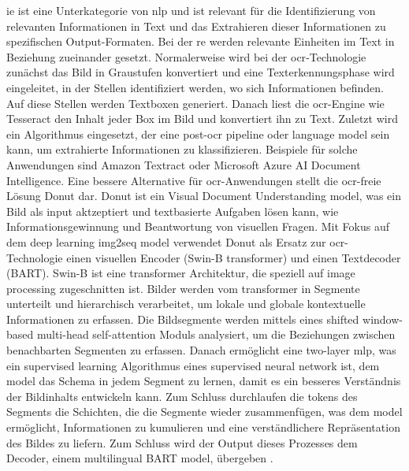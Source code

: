 \gls{ie} ist eine Unterkategorie von \gls{nlp} und ist relevant für die Identifizierung von relevanten Informationen in Text und das Extrahieren dieser Informationen zu spezifischen Output-Formaten. Bei der \gls{re} werden relevante Einheiten im Text in Beziehung zueinander gesetzt. Normalerweise wird bei der \gls{ocr}-Technologie zunächst das Bild in Graustufen konvertiert und eine Texterkennungsphase wird eingeleitet, in der Stellen identifiziert werden, wo sich Informationen befinden. Auf diese Stellen werden Textboxen generiert. Danach liest die \gls{ocr}-Engine wie Tesseract den Inhalt jeder Box im Bild und konvertiert ihn zu Text. Zuletzt wird ein Algorithmus eingesetzt, der eine post-\gls{ocr} pipeline oder language model sein kann, um extrahierte Informationen zu klassifizieren. Beispiele für solche Anwendungen sind Amazon Textract oder Microsoft Azure AI Document Intelligence. Eine bessere Alternative für \gls{ocr}-Anwendungen stellt die \gls{ocr}-freie Lösung Donut dar. Donut ist ein Visual Document Understanding model, was ein Bild als input aktzeptiert und textbasierte Aufgaben lösen kann, wie Informationsgewinnung und Beantwortung von visuellen Fragen. Mit Fokus auf dem deep learning img2seq model verwendet Donut als Ersatz zur \gls{ocr}-Technologie einen visuellen Encoder (Swin-B transformer) und einen Textdecoder (BART). Swin-B ist eine transformer Architektur, die speziell auf image processing zugeschnitten ist. Bilder werden vom transformer in Segmente unterteilt und hierarchisch verarbeitet, um lokale und globale kontextuelle Informationen zu erfassen. Die Bildsegmente werden mittels eines shifted window-based multi-head self-attention Moduls analysiert, um die Beziehungen zwischen benachbarten Segmenten zu erfassen. Danach ermöglicht eine two-layer \gls{mlp}, was ein supervised learning Algorithmus eines supervised neural network ist, dem model das Schema in jedem Segment zu lernen, damit es ein besseres Verständnis der Bildinhalts entwickeln kann. Zum Schluss durchlaufen die tokens des Segments die Schichten, die die Segmente wieder zusammenfügen, was dem model ermöglicht, Informationen zu kumulieren und eine verständlichere Repräsentation des Bildes zu liefern. Zum Schluss wird der Output dieses Prozesses dem Decoder, einem multilingual BART model, übergeben \cite{transformers-ocr}. \\

